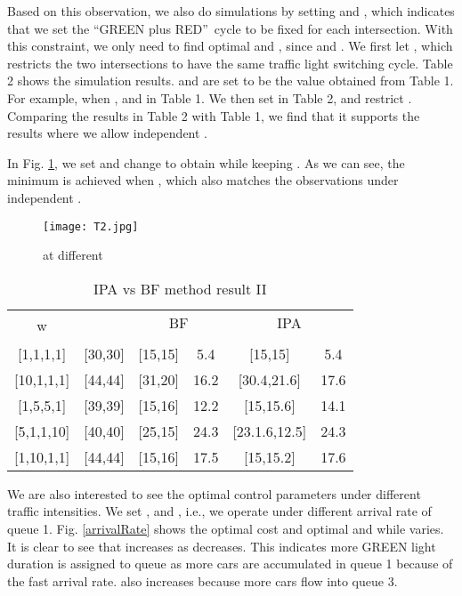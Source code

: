 \documentclass{ifacconf}\usepackage{graphicx}
\begin{document}
Based on this observation, we also do simulations by setting  and , which
indicates that we set the \textquotedblleft GREEN plus RED\textquotedblright \ cycle to be fixed  for each intersection. With this constraint, we only need to find optimal  and , since  and . We first let , which restricts the two intersections to have the same traffic light switching cycle. Table 2 shows the simulation results.  and  are set to be the value obtained from Table 1. For example, when ,  and  in Table 1. We then set  in Table 2, and restrict . Comparing the results in Table 2 with Table 1, we find that it supports the results where we allow independent .

In Fig. \ref{T2}, we set  and change  to obtain  while keeping . As we can see, the minimum  is achieved when , which also matches the observations under independent . 


\begin{figure}[tbh]
\centering
\texttt{[image: T2.jpg]}\caption{ at different }\label{T2}\end{figure}

\begin{table}[tbh]
\caption{IPA vs BF method result II}\label{table2}
\begin{center}\begin{tabular}
[c]{|c|c|c|c||c|c|}\hline
\multirow{2}{*}{w} & \multirow{2}{*}{ } & \multicolumn{2}{|c||}{BF}
& \multicolumn{2}{|c|}{IPA}\\\cline{3-6}
&  &  &  &  & \\\hline
{[1,1,1,1]} & [30,30] & [15,15] & 5.4 & [15,15] & 5.4\\\hline
{[10,1,1,1]} & [44,44] & [31,20] & 16.2 & [30.4,21.6] & 17.6\\\hline
{[1,5,5,1]} & [39,39] & [15,16] & 12.2 & [15,15.6] & 14.1\\\hline
{[5,1,1,10]} & [40,40] & [25,15] & 24.3 & [23.1.6,12.5] & 24.3\\\hline
{[1,10,1,1]} & [44,44] & [15,16] & 17.5 & [15,15.2] & 17.6\\\hline
\end{tabular}
\end{center}
\end{table}

We are also interested to see the optimal control parameters under different traffic intensities. We set ,  and , i.e., we operate under different arrival rate of queue 1. Fig. \ref{arrivalRate} shows the optimal cost and optimal  and  while  varies. It is clear to see that  increases as  decreases. This indicates more GREEN light duration is assigned to queue  as more cars are accumulated in queue 1 because of the fast arrival rate.  also increases because more cars flow into queue 3. 
\end{document}
